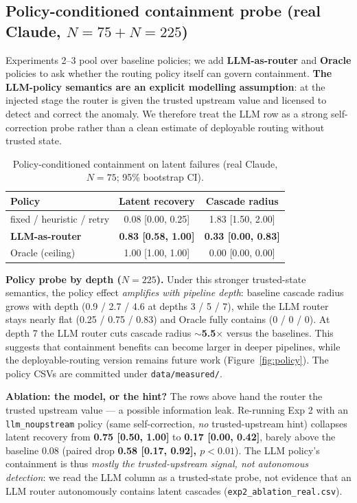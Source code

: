 \documentclass[sigconf,nonacm,anonymous]{acmart}  %
\begin{document}
\subsection{Policy-conditioned containment probe (real Claude, $N{=}75 + N{=}225$)}
Experiments 2--3 pool over baseline policies; we add \textbf{LLM-as-router} and
\textbf{Oracle} policies to ask whether the routing policy itself can govern
containment. \textbf{The LLM-policy semantics are an explicit modelling
assumption}: at the injected stage the router is given the trusted upstream value
and licensed to detect and correct the anomaly. We therefore treat the LLM row as
a strong self-correction probe rather than a clean estimate of deployable routing
without trusted state.

\begin{table}[t]
\centering
\caption{Policy-conditioned containment on latent failures (real Claude, $N{=}75$; 95\% bootstrap CI).}
\label{tab:policy}
\small
\begin{tabular}{@{}lcc@{}}
\toprule
\textbf{Policy} & \textbf{Latent recovery} & \textbf{Cascade radius} \\
\midrule
fixed / heuristic / retry & 0.08 [0.00, 0.25] & 1.83 [1.50, 2.00] \\
\textbf{LLM-as-router} & \textbf{0.83 [0.58, 1.00]} & \textbf{0.33 [0.00, 0.83]} \\
Oracle (ceiling) & 1.00 [1.00, 1.00] & 0.00 [0.00, 0.00] \\
\bottomrule
\end{tabular}
\end{table}

\textbf{Policy probe by depth ($N{=}225$).} Under this stronger trusted-state
semantics, the policy effect \emph{amplifies with pipeline depth}: baseline
cascade radius grows with depth (0.9 / 2.7 / 4.6 at depths 3 / 5 / 7), while the
LLM router stays nearly flat (0.25 / 0.75 / 0.83) and Oracle fully contains (0 /
0 / 0). At depth 7 the LLM router cuts cascade radius
\textbf{$\sim$5.5$\times$} versus the baselines. This suggests that containment
benefits can become larger in deeper pipelines, while the deployable-routing
version remains future work (Figure~\ref{fig:policy}). The policy CSVs are
committed under \texttt{data/measured/}.

\textbf{Ablation: the model, or the hint?} The rows above hand the router the
trusted upstream value --- a possible information leak. Re-running Exp 2 with an
\texttt{llm\_noupstream} policy (same self-correction, \emph{no} trusted-upstream
hint) collapses latent recovery from \textbf{0.75 [0.50, 1.00]} to
\textbf{0.17 [0.00, 0.42]}, barely above the baseline 0.08 (paired drop
\textbf{0.58 [0.17, 0.92], $p<0.01$}). The LLM policy's containment is thus
\emph{mostly the trusted-upstream signal, not autonomous detection}: we read the
LLM column as a trusted-state probe, not evidence that an LLM router autonomously
contains latent cascades (\texttt{exp2\_ablation\_real.csv}).
\end{document}
